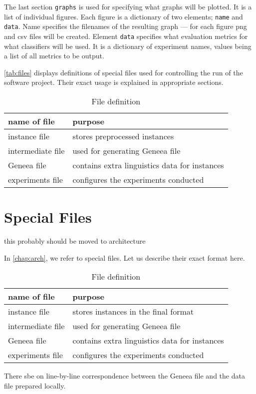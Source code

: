 The last section \texttt{graphs} is used for specifying what graphs will be plotted.
It is a list of individual figures.
Each figure is a dictionary of two elements; \texttt{name} and \texttt{data}.
Name specifies the filenames of the resulting graph ---
for each figure png and csv files will be created.
Element \texttt{data} specifies what evaluation metrics for what classifiers will be used.
It is a dictionary of experiment names, values being a list of all metrics to be output.

\autoref{tab:files} displays definitions of special files used for controlling the run of the software project.
Their exact usage is explained in appropriate sections.

\begin{table}[h]

\centering
\begin{tabular}{ll}
\toprule
\textbf{name of file}& \textbf{purpose} \\
\midrule
instance file		 & stores preprocessed instances \\
intermediate file	 & used for generating Geneea file \\
Geneea file			 & contains extra linguistics data for instances \\
experiments file	 & configures the experiments conducted \\
\bottomrule
\end{tabular}

\caption{File definition}\label{tab:files}
\end{table}


\section{Special Files}

this probably should be moved to architecture

In \autoref{chap:arch}, we refer to special files.
Let us describe their exact format here.

\begin{table}[h]

\centering
\begin{tabular}{ll}
\toprule
\textbf{name of file}& \textbf{purpose} \\
\midrule
instance file		 & stores instances in the final format \\
intermediate file	 & used for generating Geneea file \\
Geneea file			 & contains extra linguistics data for instances \\
experiments file	 & configures the experiments conducted \\
\bottomrule
\end{tabular}

\caption{File definition}\label{tab:files}
\end{table}
There sbe on line-by-line correspondence between the Geneea file and the data file prepared locally.


